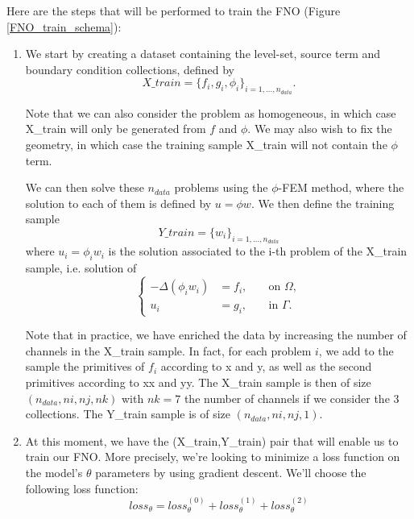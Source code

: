 Here are the steps that will be performed to train the FNO (Figure \ref{FNO_train_schema}):
\begin{enumerate}[label=\textbullet]
	\item We start by creating a dataset containing the level-set, source term and boundary condition collections, defined by
	\begin{equation*}
		X\_train = \{f_i,g_i,\phi_i\}_{i=1,\dots,n_{data}}.
	\end{equation*}
	\begin{Rem}
		Note that we can also consider the problem as homogeneous, in which case X\_train will only be generated from $f$ and $\phi$. We may also wish to fix the geometry, in which case the training sample X\_train will not contain the $\phi$ term.
	\end{Rem}
	We can then solve these $n_{data}$ problems using the $\phi$-FEM method, where the solution to each of them is defined by $u=\phi w$. We then define the training sample
	\begin{equation*}
		Y\_train=\{w_i\}_{i=1,\dots,n_{data}}
	\end{equation*}
	where $u_i = \phi_i w_i$ is the solution associated to the i-th problem of the X\_train sample, i.e. solution of
	\begin{equation*}
		\left\{\begin{aligned}
			-\Delta (\phi_i w_i)&=f_i, \; &&\text{on } \Omega, \\
			u_i&=g_i, \; &&\text{in } \Gamma.
		\end{aligned}\right.
	\end{equation*}
	\begin{Rem}
		Note that in practice, we have enriched the data by increasing the number of channels in the X\_train sample. In fact, for each problem $i$, we add to the sample the primitives of $f_i$ according to x and y, as well as the second primitives according to xx and yy. The X\_train sample is then of size $(n_{data},ni,nj,nk)$ with $nk=7$ the number of channels if we consider the 3 collections. The Y\_train sample is of size $(n_{data},ni,nj,1)$.
	\end{Rem}
	\item At this moment, we have the (X\_train,Y\_train) pair that will enable us to train our FNO. More precisely, we're looking to minimize a loss function on the model's $\theta$ parameters by using gradient descent. We'll choose the following loss function:
	\begin{equation*}
		loss_\theta = loss_\theta^{(0)} + loss_\theta^{(1)} + loss_\theta^{(2)}

\end{equation*}
\end{enumerate}
